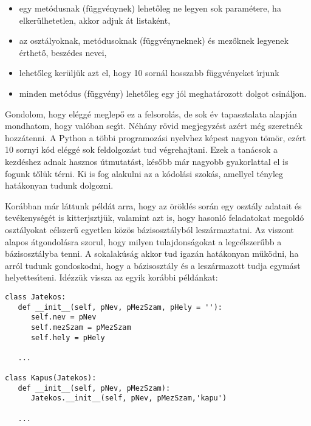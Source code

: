 \begin{itemize}
   \item egy met\'odusnak (f\"uggv\'enynek) lehet\H{o}leg ne legyen sok param\'etere, ha elker\"ulhetetlen, akkor adjuk \'at 
      listak\'ent,
   \item az oszt\'alyoknak, met\'odusoknak (f\"uggv\'enyneknek) \'es mez\H{o}knek legyenek \'ert\-he\-t\H{o}, besz\'edes 
      nevei,
   \item lehet\H{o}leg ker\"ulj\"uk azt el, hogy 10 sorn\'al hosszabb f\"uggv\'enyeket \'{\i}rjunk
   \item minden met\'odus (f\"uggv\'eny) lehet\H{o}leg egy j\'ol meghat\'arozott dolgot csin\'aljon.
\end{itemize}

Gondolom, hogy el\'egg\'e meglep\H{o} ez a felsorol\'as, de sok \'ev tapasztalata alapj\'an mondhatom, hogy val\'oban seg\'{\i}t. 
N\'eh\'any r\"ovid megjegyz\'est az\'ert m\'eg szeretn\'ek hozz\'atenni. A Python a t\"obbi programoz\'asi nyelvhez k\'epest 
nagyon t\"om\"or, ez\'ert 10 sornyi k\'od el\'egg\'e sok feldolgoz\'ast tud v\'egrehajtani. Ezek a tan\'acsok a kezd\'eshez 
adnak hasznos \'utmutat\'ast, k\'es\H{o}bb m\'ar nagyobb gyakorlattal el is fogunk t\H{o}l\"uk t\'erni. Ki is fog alakulni az 
a k\'odol\'asi szok\'as, amellyel t\'enyleg hat\'akonyan tudunk dolgozni.

 
Kor\'abban m\'ar l\'attunk p\'eld\'at arra, hogy az \"or\"okl\'es sor\'an egy oszt\'aly adatait \'es tev\'ekenys\'eg\'et 
is kitterjsztj\"uk, valamint azt is, hogy hasonl\'o feladatokat megold\'o oszt\'alyokat c\'elszer\H{u} egyetlen k\"oz\"os 
b\'azisoszt\'alyb\'ol lesz\'armaztatni. Az viszont alapos \'atgondol\'asra szorul, hogy milyen tulajdons\'agokat a 
legc\'elszer\H{u}bb a b\'azisoszt\'alyba tenni. A sokalak\'us\'ag akkor tud igaz\'an hat\'akonyan m\H{u}k\"odni, ha arr\'ol 
tudunk gondoskodni, hogy a b\'azisoszt\'aly \'es a lesz\'armazott tudja egym\'ast helyettes\'{\i}teni. Id\'ezz\"uk vissza 
az egyik kor\'abbi p\'eld\'ankat:

\begin{Verbatim}[fontsize=\small]
class Jatekos:
   def __init__(self, pNev, pMezSzam, pHely = ''):
      self.nev = pNev
      self.mezSzam = pMezSzam
      self.hely = pHely

   ...

class Kapus(Jatekos):
   def __init__(self, pNev, pMezSzam):
      Jatekos.__init__(self, pNev, pMezSzam,'kapu')

   ...   
\end{Verbatim}

